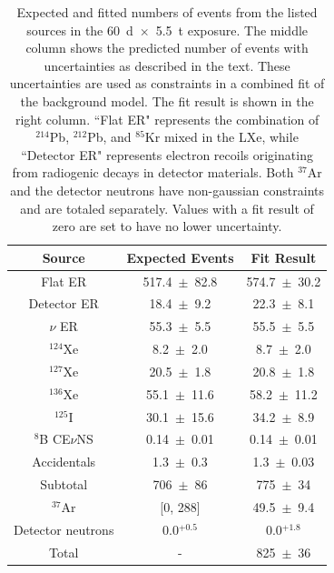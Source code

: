 \documentclass[reprint, showpacs,
preprintnumbers,
amsmath,amssymb,
aps, floatfix,
superscriptaddress,
prd, nofootinbib]{revtex4-1}
\begin{document}
\begin{table}[ht]
    \centering
    \caption{Expected and fitted numbers of events from the listed sources in the 60~d~$\times$~5.5~t exposure.
    The middle column shows the predicted number of events with uncertainties as described in the text.
    These uncertainties are used as constraints in a combined fit of the background model.
    The fit result is shown in the right column. ``Flat ER" represents the combination of ${}^{214}$Pb, ${}^{212}$Pb, and ${}^{85}$Kr mixed in the LXe, while ``Detector ER" represents electron recoils originating from radiogenic decays in detector materials.
    Both ${}^{37}$Ar and the detector neutrons have non-gaussian constraints and are totaled separately.
    Values with a fit result of zero are set to have no lower uncertainty.
    }
    \begin{ruledtabular}
    \begin{tabular}{ccc}
        Source                   & Expected Events      & Fit Result        \\ \hline
        Flat ER                  & 517.4~$\pm$~82.8     & 574.7~$\pm$~30.2  \\
        Detector ER              & 18.4~$\pm$~9.2       & 22.3~$\pm$~8.1    \\
        $\nu$ ER                 & 55.3~$\pm$~5.5       & 55.5~$\pm$~5.5    \\
        ${}^{124}$Xe             & 8.2~$\pm$~2.0        & 8.7~$\pm$~2.0     \\
        ${}^{127}$Xe             & 20.5~$\pm$~1.8       & 20.8~$\pm$~1.8    \\
        ${}^{136}$Xe             & 55.1~$\pm$~11.6      & 58.2~$\pm$~11.2   \\
        ${}^{125}$I              & 30.1~$\pm$~15.6      & 34.2~$\pm$~8.9    \\
        ${}^{8}$B CE$\nu$NS      & 0.14~$\pm$~0.01      & 0.14~$\pm$~0.01   \\
        Accidentals              & 1.3~$\pm$~0.3        & 1.3~$\pm$~0.03    \\ \hline
        Subtotal                 & 706~$\pm$~86         & 775~$\pm$~34 \\ \hline
        ${}^{37}$Ar              & [0, 288]             & 49.5~$\pm$~9.4    \\
        Detector neutrons        & 0.0$^{+0.5}$         & 0.0$^{+1.8}$      \\ \hline
        Total                    & -                    & 825~$\pm$~36  
    \end{tabular}
    \end{ruledtabular}
    \label{tab:fit_result} 
\end{table}
\end{document}
